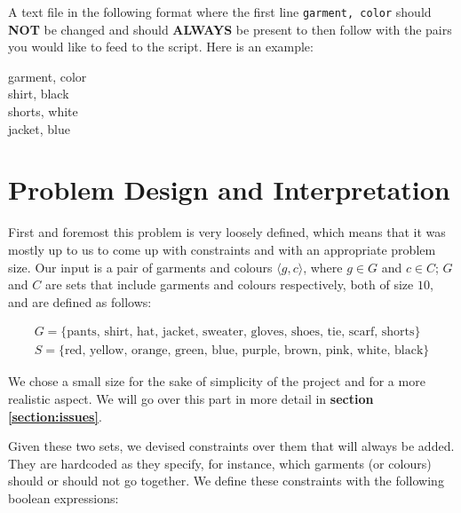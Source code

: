 \documentclass[12pt]{article}
\newcommand{\mygather}[1]{\begin{gather*} #1 \end{gather*}}
\begin{document}
A text file in the following format where the first line \texttt{garment, color} should \textbf{NOT} be changed and should \textbf{ALWAYS} be present to then follow with the pairs you would like to feed to the script. Here is an example:

\begin{center}

	{
		\ttfamily
		garment, color\\
		shirt, black\\
		shorts, white\\
		jacket, blue\\
}
\end{center}

\section{Problem Design and Interpretation}\label{section:design}

    First and foremost this problem is very loosely defined, which means that it was mostly up to us to come up with constraints and with an appropriate problem size. Our input is a pair of garments and colours $\langle g, c \rangle$, where $g \in G$ and $c \in C$; $G$ and $C$ are sets that include garments and colours respectively, both of size $10$, and are defined as follows:

    \mygather{
        G = \{\text{pants, shirt, hat, jacket, sweater, gloves, shoes, tie, scarf, shorts} \} \\
        S = \{\text{red, yellow, orange, green, blue, purple, brown, pink, white, black} \}
    }

    We chose a small size for the sake of simplicity of the project and for a more realistic aspect. We will go over this part in more detail in \textbf{section \ref{section:issues}}.

    Given these two sets, we devised constraints over them that will always be added. They are hardcoded as they specify, for instance, which garments (or colours) should or should not go together.
    We define these constraints with the following boolean expressions:
\end{document}
